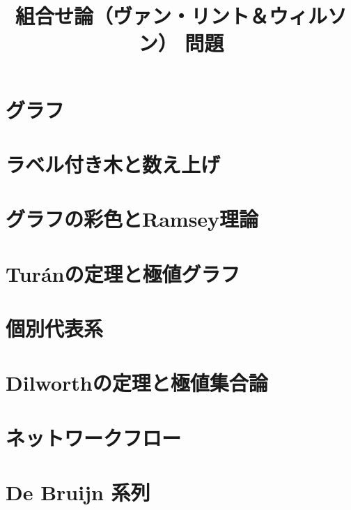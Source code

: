 \documentclass{jarticle}
\title{組合せ論（ヴァン・リント＆ウィルソン） 問題}
\begin{document}
\maketitle

\section{グラフ}











\newpage

\section{ラベル付き木と数え上げ}









\newpage

\section{グラフの彩色とRamsey理論}












\newpage

\section{Tur\'{a}nの定理と極値グラフ}










\newpage

\section{個別代表系}








\newpage

\section{Dilworthの定理と極値集合論}






\newpage

\section{ネットワークフロー}







\newpage

\section{De Bruijn 系列}




\end{document}
